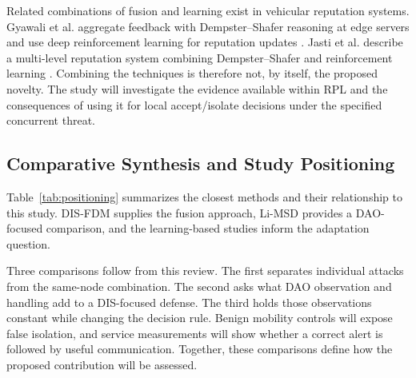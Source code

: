 \documentclass[journal]{IEEEtran}
\begin{document}
Related combinations of fusion and learning exist in vehicular reputation systems. Gyawali et al. aggregate feedback with Dempster--Shafer reasoning at edge servers and use deep reinforcement learning for reputation updates \cite{gyawali2021}. Jasti et al. describe a multi-level reputation system combining Dempster--Shafer and reinforcement learning \cite{jasti2024}. Combining the techniques is therefore not, by itself, the proposed novelty. The study will investigate the evidence available within RPL and the consequences of using it for local accept/isolate decisions under the specified concurrent threat.

\subsection{Comparative Synthesis and Study Positioning}
Table~\ref{tab:positioning} summarizes the closest methods and their relationship to this study. DIS-FDM supplies the fusion approach, Li-MSD provides a DAO-focused comparison, and the learning-based studies inform the adaptation question.

Three comparisons follow from this review. The first separates individual attacks from the same-node combination. The second asks what DAO observation and handling add to a DIS-focused defense. The third holds those observations constant while changing the decision rule. Benign mobility controls will expose false isolation, and service measurements will show whether a correct alert is followed by useful communication. Together, these comparisons define how the proposed contribution will be assessed.
\end{document}
